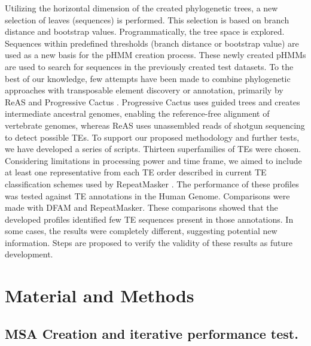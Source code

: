 \documentclass[unnumsec,webpdf,contemporary,large]{oup-authoring-template}%
\theoremstyle{thmstyleone}%
\theoremstyle{thmstyletwo}%
\theoremstyle{thmstylethree}%
\begin{document}
Utilizing the horizontal dimension of the created phylogenetic trees, a new selection of leaves (sequences) is performed. This selection is based on branch distance and bootstrap values. Programmatically, the tree space is explored. Sequences within predefined thresholds (branch distance or bootstrap value) are used as a new basis for the pHMM creation process. These newly created pHMMs are used to search for sequences in the previously created test datasets. To the best of our knowledge, few attempts have been made to combine phylogenetic approaches with transposable element discovery or annotation, primarily by ReAS \cite{li_reas_2005} and Progressive Cactus \cite{armstrong_progressive_2020}. Progressive Cactus uses guided trees and creates intermediate ancestral genomes, enabling the reference-free alignment of vertebrate genomes, whereas ReAS uses unassembled reads of shotgun sequencing to detect possible TEs. To support our proposed methodology and further tests, we have developed a series of scripts. Thirteen superfamilies of TEs were chosen. Considering limitations in processing power and time frame, we aimed to include at least one representative from each TE order described in current TE classification schemes used by RepeatMasker \cite{kapitonov_universal_2008}. The performance of these profiles was tested against TE annotations in the Human Genome. Comparisons were made with DFAM and RepeatMasker. These comparisons showed that the developed profiles identified few TE sequences present in those annotations. In some cases, the results were completely different, suggesting potential new information. Steps are proposed to verify the validity of these results as future development.

\section{Material and Methods}\label{sec2}
\subsection{MSA Creation and iterative performance test.}\label{subsec2_1}
\end{document}
